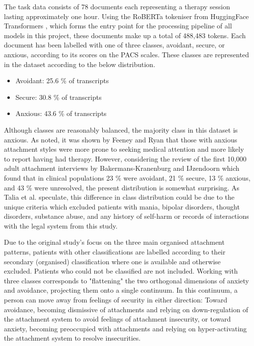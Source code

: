 \documentclass[12pt]{report}
\begin{document}
The task data consists of 78 documents each representing a therapy session lasting approximately one hour.
Using the RoBERTa tokeniser from HuggingFace Transformers \cite{HuggingFace}, which forms the entry point for the processing pipeline of all models in this project, these documents make up a total of 488,483 tokens.
Each document has been labelled with one of three classes, avoidant, secure, or anxious, according to its scores on the PACS scales.
These classes are represented in the dataset according to the below distribution.
\begin{itemize}
    \item {Avoidant: 25.6 \% of transcripts}
    \item {Secure: 30.8 \% of transcripts}
    \item {Anxious: 43.6 \% of transcripts}
\end{itemize}
Although classes are reasonably balanced, the majority class in this dataset is anxious.
As noted, it was shown by Feeney and Ryan \citeyear{Feeney1994} that those with anxious attachment styles were more prone to seeking medical attention and more likely to report having had therapy.
However, considering the review of the first 10,000 adult attachment interviews by Bakermans-Kranenburg and IJzendoorn \citeyear{Bakermanskranenburg2009} which found that in clinical populations 23 \% were avoidant, 21 \% secure, 13 \% anxious, and 43 \% were unresolved, the present distribution is somewhat surprising.
As Talia et al. \citeyear{Talia2017} speculate, this difference in class distribution could be due to the unique criteria which excluded patients with mania, bipolar disorders, thought disorders, substance abuse, and any history of self-harm or records of interactions with the legal system from this study.

Due to the original study's focus on the three main organised attachment patterns, patients with other classifications are labelled according to their secondary (organised) classification where one is available and otherwise excluded.
Patients who could not be classified are not included.
Working with three classes corresponds to "flattening" the two orthogonal dimensions of anxiety and avoidance, projecting them onto a single continuum.
In this continuum, a person can move away from feelings of security in either direction: Toward avoidance, becoming dismissive of attachments and relying on down-regulation of the attachment system to avoid feelings of attachment insecurity, or toward anxiety, becoming preoccupied with attachments and relying on hyper-activating the attachment system to resolve insecurities.
\end{document}
